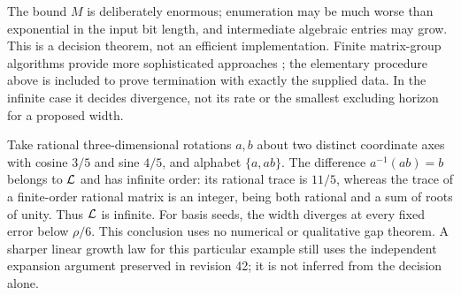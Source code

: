 \begin{remark}
The bound $M$ is deliberately enormous; enumeration may be much worse than exponential in the input bit length, and intermediate algebraic entries may grow. This is a decision theorem, not an efficient implementation. Finite matrix-group algorithms provide more sophisticated approaches \cite{DFO}; the elementary procedure above is included to prove termination with exactly the supplied data. In the infinite case it decides divergence, not its rate or the smallest excluding horizon for a proposed width.
\end{remark}

\begin{example}\label{ex:finite-data45}
Take rational three-dimensional rotations $a,b$ about two distinct coordinate axes with cosine $3/5$ and sine $4/5$, and alphabet $\{a,ab\}$. The difference $a^{-1}(ab)=b$ belongs to $\mathcal L$ and has infinite order: its rational trace is $11/5$, whereas the trace of a finite-order rational matrix is an integer, being both rational and a sum of roots of unity. Thus $\mathcal L$ is infinite. For basis seeds, the width diverges at every fixed error below $\rho/6$. This conclusion uses no numerical or qualitative gap theorem. A sharper linear growth law for this particular example still uses the independent expansion argument preserved in revision 42; it is not inferred from the decision alone.
\end{example}
